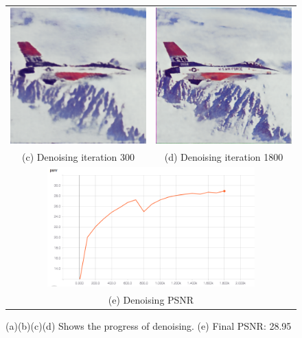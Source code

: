 \documentclass[A4]{article}
\begin{document}
\begin{figure}[H]
\begin{tabular}{cc}
\includegraphics[width=80mm]{denoising-iteration-300.png} & \includegraphics[width=80mm]{denoising-iteration-1800.png} \\
(c) Denoising iteration 300 & (d) Denoising iteration 1800 \\[6pt]
\multicolumn{2}{c}{\includegraphics[width=80mm]{denoising-psnr.png}}\\
\multicolumn{2}{c}{(e) Denoising PSNR }
\end{tabular}
\caption{(a)(b)(c)(d) Shows the progress of denoising. (e) Final PSNR: 28.95}
\end{figure}
\end{document}
